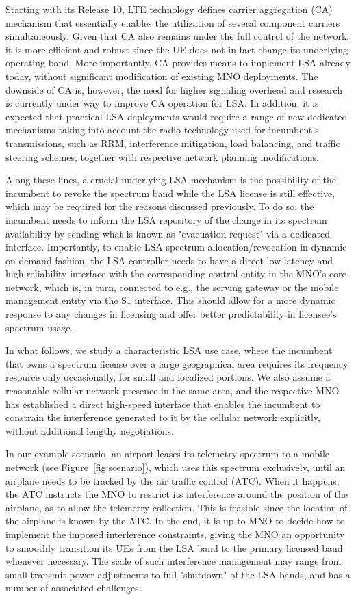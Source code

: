 \documentclass[journal]{IEEEtran}
\begin{document}
Starting with its Release 10, LTE technology defines carrier aggregation (CA) mechanism that essentially enables the utilization of several component carriers simultaneously. Given that CA also remains under the full control of the network, it is more efficient and robust since the UE does not in fact change its underlying operating band. More importantly, CA provides means to implement LSA already today, without significant modification of existing MNO deployments. The downside of CA is, however, the need for higher signaling overhead and research is currently under way to improve CA operation for LSA. In addition, it is expected that practical LSA deployments would require a range of new dedicated mechanisms taking into account the radio technology used for incumbent's transmissions, such as RRM, interference mitigation, load balancing, and traffic steering schemes, together with respective network planning modifications.

Along these lines, a crucial underlying LSA mechanism is the possibility of the incumbent to revoke the spectrum band while the LSA license is still effective, which may be required for the reasons discussed previously. To do so, the incumbent needs to inform the LSA repository of the change in its spectrum availability by sending what is known as "evacuation request" via a dedicated interface. Importantly, to enable LSA spectrum allocation/revocation in dynamic on-demand fashion, the LSA controller needs to have a direct low-latency and high-reliability interface with the corresponding control entity in the MNO's core network, which is, in turn, connected to e.g., the serving gateway or the mobile management entity via the S1 interface. This should allow for a more dynamic response to any changes in licensing and offer better predictability in licensee's spectrum usage.

In what follows, we study a characteristic LSA use case, where the incumbent that owns a spectrum license over a large geographical area requires its frequency resource only occasionally, for small and localized portions. We also assume a reasonable cellular network presence in the same area, and the respective MNO has established a direct high-speed interface that enables the incumbent to constrain the interference generated to it by the cellular network explicitly, without additional lengthy negotiations.

In our example scenario, an airport leases its telemetry spectrum to a mobile network (see Figure~\ref{fig:scenario}), which uses this spectrum exclusively, until an airplane needs to be tracked by the air traffic control (ATC). When it happens, the ATC instructs the MNO to restrict its interference around the position of the airplane, as to allow the telemetry collection. This is feasible since the location of the airplane is known by the ATC. In the end, it is up to MNO to decide how to implement the imposed interference constraints, giving the MNO an opportunity to smoothly transition its UEs from the LSA band to the primary licensed band whenever necessary. The scale of such interference management may range from small transmit power adjustments to full "shutdown" of the LSA bands, and has a number of associated challenges: 
 
\end{document}
